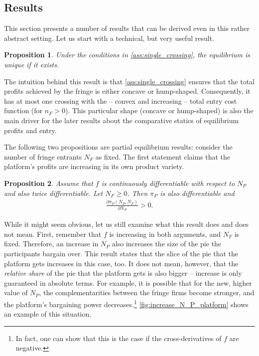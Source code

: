 \documentclass[a4paper]{article}
\newtheorem{proposition}{Proposition}
\begin{document}
\subsection{Results}
\label{sec:more_general_results}

This section presents a number of results that can be derived even in this rather abstract setting.
Let us start with a technical, but very useful result.
\begin{proposition}
    \label{prop:unique_equilibrium_more_general}
    Under the conditions in \cref{ass:single_crossing}, the equilibrium is unique if it exists.
\end{proposition}
The intuition behind this result is that \cref{ass:single_crossing} ensures that the total profits achieved by the fringe is either concave or hump-shaped.
Consequently, it has at most one crossing with the -- convex and increasing -- total entry cost function (for $n_F > 0$).
This particular shape (concave or hump-shaped) is also the main driver for the later results about the comparative statics of equilibrium profits and entry.

The following two propositions are partial equilibrium results: consider the number of fringe entrants $N_F$ as fixed.
The first statement claims that the platform's profits are increasing in its own product variety.
\begin{proposition}
    \label{prop:share_of_platform}
    Assume that $f$ is continuously differentiable with respect to $N_P$ and also twice differentiable.
    Let $N_F \geq 0$.
    Then $\pi_P$ is also differentiable and
    \begin{align*}
        \frac{\partial \pi_P(N_P, N_F)}{\partial N_P} > 0.
    \end{align*}
\end{proposition}
While it might seem obvious, let us still examine what this result does and does not mean.
First, remember that $f$ is increasing in both arguments, and $N_F$ is fixed.
Therefore, an increase in $N_P$ also increases the size of the pie the participants bargain over.
This result states that the slice of the pie that the platform gets increases in this case, too.
It does not mean, however, that the \emph{relative share} of the pie that the platform gets is also bigger -- increase is only guaranteed in absolute terms.
For example, it is possible that for the new, higher value of $N_P$, the complementarities between the fringe firms become stronger, and the platform's bargaining power decreases.\footnote{
    In fact, one can show that this is the case if the cross-derivatives of $f$ are negative.
}
\cref{fig:increase_N_P_platform} shows an example of this situation.
\end{document}
